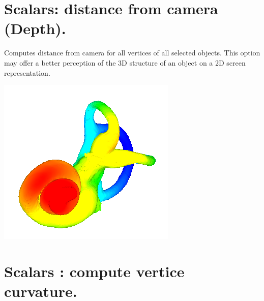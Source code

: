 \section{Scalars: distance from camera (Depth).}
\noindent
\begin{minipage}{0.5\textwidth}
Computes distance from camera for all vertices of
all selected objects. This option may offer a better
perception of the 3D structure of an object on a
2D screen representation.
\end{minipage}    
\begin{minipage}{0.5\textwidth}\centering
  \includegraphics[scale=0.5]{images/Scalars_renreding/Depth.png}
\label{depth_scalar}
 \end{minipage} 
\noindent



\section{Scalars : compute vertice curvature.}

